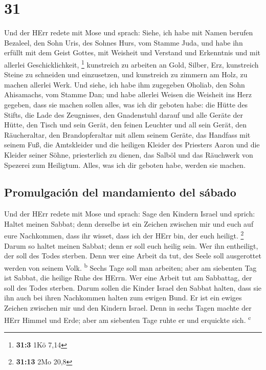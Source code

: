 \hypertarget{section-30}{%
\section{31}\label{section-30}}

 Und der HErr redete mit Mose und sprach: 
Siehe, ich habe mit Namen berufen Bezaleel, den Sohn Uris, des Sohnes
Hurs, vom Stamme Juda,  und habe ihn erfüllt mit dem Geist
Gottes, mit Weisheit und Verstand und Erkenntnis und mit allerlei
Geschicklichkeit, \footnote{\textbf{31:3} 1Kö 7,14} 
kunstreich zu arbeiten an Gold, Silber, Erz,  kunstreich
Steine zu schneiden und einzusetzen, und kunstreich zu zimmern am Holz,
zu machen allerlei Werk.  Und siehe, ich habe ihm
zugegeben Oholiab, den Sohn Ahisamachs, vom Stamme Dan; und habe
allerlei Weisen die Weisheit ins Herz gegeben, dass sie machen sollen
alles, was ich dir geboten habe:  die Hütte des Stifts,
die Lade des Zeugnisses, den Gnadenstuhl darauf und alle Geräte der
Hütte,  den Tisch und sein Gerät, den feinen Leuchter und
all sein Gerät, den Räucheraltar,  den Brandopferaltar mit
allem seinem Geräte, das Handfass mit seinem Fuß,  die
Amtskleider und die heiligen Kleider des Priesters Aaron und die Kleider
seiner Söhne, priesterlich zu dienen,  das Salböl und das
Räuchwerk von Spezerei zum Heiligtum. Alles, was ich dir geboten habe,
werden sie machen.

\hypertarget{promulgaciuxf3n-del-mandamiento-del-suxe1bado}{%
\subsection{Promulgación del mandamiento del
sábado}\label{promulgaciuxf3n-del-mandamiento-del-suxe1bado}}

 Und der HErr redete mit Mose und sprach: 
Sage den Kindern Israel und sprich: Haltet meinen Sabbat; denn derselbe
ist ein Zeichen zwischen mir und euch auf eure Nachkommen, dass ihr
wisset, dass ich der HErr bin, der euch heiligt. \footnote{\textbf{31:13}
  2Mo 20,8}  Darum so haltet meinen Sabbat; denn er soll
euch heilig sein. Wer ihn entheiligt, der soll des Todes sterben. Denn
wer eine Arbeit da tut, des Seele soll ausgerottet werden von seinem
Volk. \textsuperscript{b}  Sechs Tage soll man arbeiten;
aber am siebenten Tag ist Sabbat, die heilige Ruhe des HErrn. Wer eine
Arbeit tut am Sabbattag, der soll des Todes sterben. 
Darum sollen die Kinder Israel den Sabbat halten, dass sie ihn auch bei
ihren Nachkommen halten zum ewigen Bund.  Er ist ein
ewiges Zeichen zwischen mir und den Kindern Israel. Denn in sechs Tagen
machte der HErr Himmel und Erde; aber am siebenten Tage ruhte er und
erquickte sich. \textsuperscript{c}

